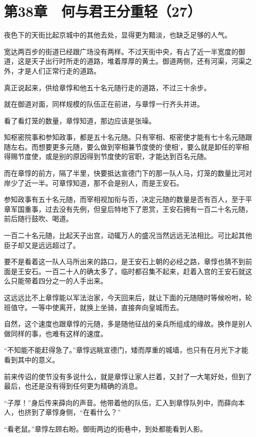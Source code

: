 \section{第38章　何与君王分重轻（27）}

夜色下的天街比起京城中的其他去处，显得更为黯淡，也缺乏足够的人气。

宽达两百步的街道已经跟广场没有两样。不过天街中央，有占了近一半宽度的御道，这是天子出行时所走的道路，堆着厚厚的黄土。御道两侧，还有河渠，河渠之外，才是人们正常行走的道路。

真正说起来，供给章惇和他五十名元随行走的道路，不过三十余步。

就在御道对面，同样规模的队伍正在前进，与章惇一行齐头并进。

看了看灯笼的数量，章惇知道，那边应该是张璪。

知枢密院事和参知政事，都是五十名元随。只有宰相、枢密使才能有七十名元随跟随左右。而想要更多元随，要么做到宰相兼节度使的‘使相’，要么就是卸任的宰相得赐节度使，或是别的原因得到节度使的官职，才能达到百名元随。

而在章惇的前方，隔了半里，快要抵达宣德门下的那一队人马，灯笼的数量比河对岸少了近一半。可章惇知道，那不会是别人，而是王安石。

参知政事有五十名元随，而宰相视加衔与否，决定元随的数量是否有百人，至于平章军国重事，过去没有先例，但皇后特地下了恩赏，王安石拥有一百二十名元随，前后随行鼓吹、喝道。

一百二十名元随，比起天子出宫，动辄万人的盛况当然远远无法相比。可比起其他臣子却又是远远超过了。

要不是看着这一队人马所出来的路口，是王安石上朝的必经之路，章惇也猜不到前面是王安石。一百二十人的确太多了，临时都召集不起来，赶着入宫的王安石就这么只能带着四分之一的人手出来。

这远远比不上章惇能以军法治家，今天回来后，就让下面的元随随时等候吩咐，轮班值守。一等中使离开，就换上坐骑，直接奔向皇城而去。

自然，这个速度也跟章惇的元随，多是随他征战的亲兵所组成的缘故。换作是别人做同样的事，也难有这样的速度。

“不知能不能赶得急了。”章惇远眺宣德门，矮而厚重的城墙，也只有在月光下才能看到其中的意义。

前来传诏的使节没有多说什么，就是章惇让家人拦着，又封了一大笔好处，但到了最后，也还是没有得到任何更为精确的消息。

“子厚！”身后传来薛向的声音。他带着他的队伍，汇入到章惇队列中，而薛向本人，也挤到了章惇身侧，“在看什么？”

“看老鼠。”章惇左顾右盼。御街两边的街巷中，到处都能看到人影。

